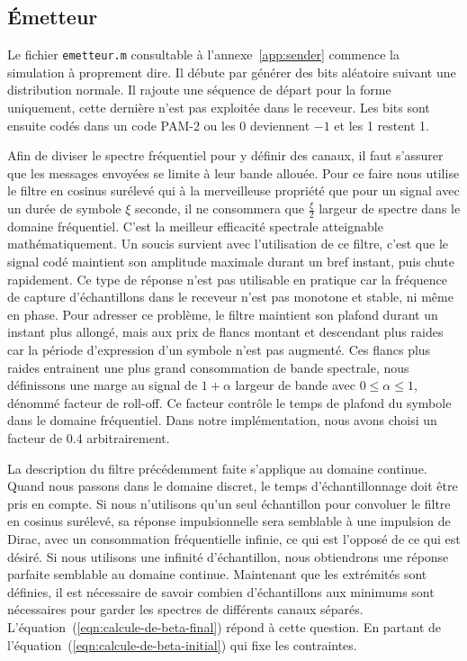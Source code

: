 \documentclass[10pt, oneside, a4paper]{article}
\begin{document}
\subsection{Émetteur}
Le fichier \texttt{emetteur.m} consultable à l'annexe~\ref{app:sender} commence la simulation à proprement dire.
Il débute par générer des bits aléatoire suivant une distribution normale.
Il rajoute une séquence de départ pour la forme uniquement, cette dernière n'est pas exploitée dans le receveur.
Les bits sont ensuite codés dans un code PAM-2 ou les 0 deviennent $-1$ et les 1 restent 1.

Afin de diviser le spectre fréquentiel pour y définir des canaux, il faut s'assurer que les messages envoyées se limite à leur bande allouée.
Pour ce faire nous utilise le filtre en cosinus surélevé qui à la merveilleuse propriété que pour un signal avec un durée de symbole $\xi$ seconde, il ne consommera que $\frac{\xi}{2}$ largeur de spectre dans le domaine fréquentiel.
C'est la meilleur efficacité spectrale atteignable mathématiquement.
Un soucis survient avec l'utilisation de ce filtre, c'est que le signal codé maintient son amplitude maximale durant un bref instant, puis chute rapidement.
Ce type de réponse n'est pas utilisable en pratique car la fréquence de capture d'échantillons dans le receveur n'est pas monotone et stable, ni même en phase.
Pour adresser ce problème, le filtre maintient son plafond durant un instant plus allongé, mais aux prix de flancs montant et descendant plus raides car la période d'expression d'un symbole n'est pas augmenté.
Ces flancs plus raides entrainent une plus grand consommation de bande spectrale, nous définissons une marge au signal de $1+\alpha$ largeur de bande avec $0\leq\alpha\leq1$, dénommé \og{}facteur de roll-off\fg{}.
Ce facteur contrôle le temps de \og{}plafond\fg{} du symbole dans le domaine fréquentiel.
Dans notre implémentation, nous avons choisi un facteur de \num{0.4} arbitrairement.

La description du filtre précédemment faite s'applique au domaine continue.
Quand nous passons dans le domaine discret, le temps d'échantillonnage doit être pris en compte.
Si nous n'utilisons qu'un seul échantillon pour convoluer le filtre en cosinus surélevé, sa réponse impulsionnelle sera semblable à une impulsion de Dirac, avec un consommation fréquentielle infinie, ce qui est l'opposé de ce qui est désiré.
Si nous utilisons une infinité d'échantillon, nous obtiendrons une réponse parfaite semblable au domaine continue.
Maintenant que les extrémités sont définies, il est nécessaire de savoir combien d'échantillons aux minimums sont nécessaires pour garder les spectres de différents canaux séparés.
L'équation~(\ref{eqn:calcule-de-beta-final}) répond à cette question.
En partant de l'équation~(\ref{eqn:calcule-de-beta-initial}) qui fixe les contraintes.
\end{document}
